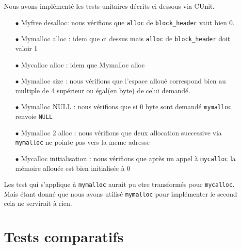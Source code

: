 \documentclass[10pt,a4paper]{article}
\begin{document}
Nous avons implémenté les tests unitaires décrits ci dessous via CUnit.
\begin{itemize}
	\item [$\bullet$] Myfree desalloc: nous vérifions que \texttt{alloc} de \texttt{block\_header} vaut bien 0.
	\item [$\bullet$] Mymalloc alloc : idem que ci dessus mais \texttt{alloc} de \texttt{block\_header} doit valoir 1
	\item [$\bullet$] Mycalloc alloc : idem que Mymalloc alloc
	\item [$\bullet$] Mymalloc size : nous vérifions que l'espace alloué correspond bien au multiple de 4 supérieur ou égal(en byte) de celui demandé.
	\item [$\bullet$] Mymalloc NULL : nous vérifions que si 0 byte sont demandé \texttt{mymalloc} renvoie \texttt{NULL}
	\item [$\bullet$] Mymalloc 2 alloc : nous vérifions que deux allocation successive via \texttt{mymalloc} ne pointe pas vers la meme adresse
	\item [$\bullet$] Mycalloc initialisation : nous vérifions que après un appel à \texttt{mycalloc} la mémoire allouée est bien initialisée à 0
\end{itemize}
Les test qui s'applique à \texttt{mymalloc} aurait pu etre transformés pour \texttt{mycalloc}. Mais étant donné que nous avons utilisé \texttt{mymalloc} pour implémenter le second cela ne servirait à rien.


\section{Tests comparatifs}
\end{document}
